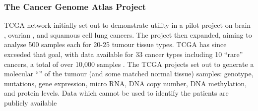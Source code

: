 \subsubsection{The Cancer Genome Atlas Project} \label{TCGA_Intro}
\gls{TCGA} network initially set out to demonstrate utility in a pilot project on brain \citep{TCGA2008GBM}, ovarian \citep{TCGA2011OV}, and squamous cell lung \citep{TCGA2012LUSC} cancers. 
The project then expanded, aiming to analyse 500 samples each for 20-25 \gls{tumour} tissue types. \gls{TCGA} has since exceeded that goal, with data available for 33 cancer types including 10 ``rare'' cancers, a total of over 10,000 samples \citep{TCGA2017web}.
%
The \gls{TCGA} projects set out to generate a molecular ``'' of the \gls{tumour} (and some matched normal tissue) samples: genotype,  \glspl{mutation}, \gls{gene expression}, micro RNA, \acrshort{DNA} copy number, \acrshort{DNA} methylation, and protein levels. %
Data which cannot be used to identify the patients are publicly available

\iffalse
